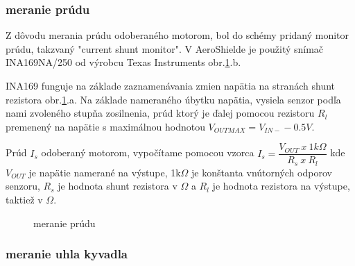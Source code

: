 \subsubsection{meranie prúdu}
\label{merprud}

Z dôvodu merania prúdu odoberaného motorom, bol do schémy pridaný monitor prúdu, takzvaný "current shunt monitor". V AeroShielde je použitý snímač INA169NA/250 od výrobcu Texas Instruments obr.\ref{OBRAZOK 2.3.2}.b.

INA169 funguje na základe zaznamenávania zmien napätia na stranách shunt rezistora obr.\ref{OBRAZOK 2.3.2}.a. Na základe nameraného úbytku napätia, vysiela senzor podľa nami zvoleného stupňa zosilnenia, prúd ktorý je ďalej pomocou rezistoru $R_{l}$ premenený na napätie s maximálnou hodnotou $V_{OUTMAX} = V_{IN-} - 0.5V $.

Prúd $I_{s}$ odoberaný motorom, vypočítame pomocou vzorca $I_{s} = \dfrac{V_{OUT}\: x \: 1k\Omega}{R_{s} \: x \: R_{l}} $ kde $V_{OUT}$ je napätie namerané na výstupe, 1k$\Omega$ je konštanta vnútorných odporov senzoru, $R_{s}$ je hodnota shunt rezistora v $\Omega$ a $R_{l}$ je hodnota rezistora na výstupe, taktiež v $\Omega$\cite{INA}.

\begin{figure}[!tbh]
	\hfill
	\hfill
	\hfill
	\caption{meranie prúdu}\label{OBRAZOK 2.3.2}
\end{figure}


\label{Hall}
\pagebreak

\subsubsection{meranie uhla kyvadla}
\label{meruhl}

